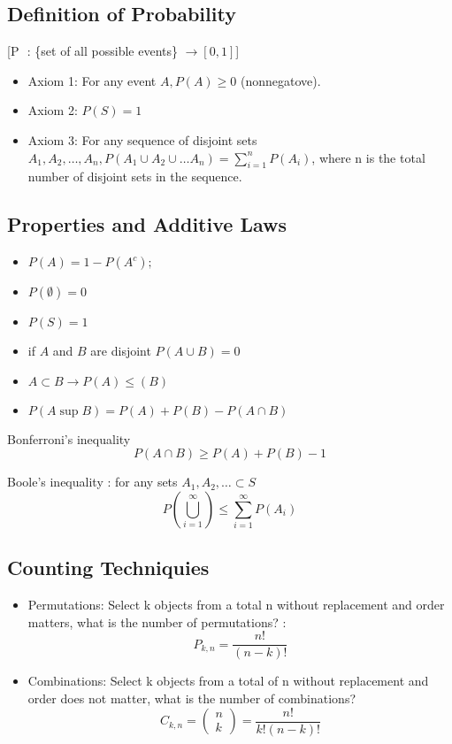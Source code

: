 \documentclass[12pt]{article}
\begin{document}
\subsection*{Definition of Probability \cite[p.4]{classnotes.2}}
[P \(\) : \{set of all possible events\} $\rightarrow [0,1]$]
\begin{itemize}

\item Axiom 1: For any event $A, P(A)\geq 0$ (nonnegatove).
\item Axiom 2: $P(S)=1$
\item Axiom 3: For any sequence of disjoint sets $A_1,A_2,\dots,A_n, P(A_1 \cup A_2 \cup \dots A_n)=\sum\limits_{i=1}^nP(A_i)$, where n is the total number of disjoint sets in the sequence.

\end {itemize}

\subsection*{Properties and Additive Laws \cite[p.5]{classnotes.2}}
\begin{itemize}
\item $P(A)=1-P(A^c);$
\item $P(\emptyset)=0$
\item $P(S)=1$
\item if $A$ and $B$ are disjoint $P(A\cup B)=0$
\item $A\subset B \rightarrow P(A)\leq (B)$
\item $P(A \sup B) = P(A) + P(B) - P(A \cap B)$
\end{itemize}

Bonferroni's inequality \cite[p.6]{classnotes.2}
$$P(A\cap B) \geq P(A) + P(B) - 1$$

Boole's inequality \cite[p.5]{classnotes.2}: for any sets $A_1, A_2, \dots \subset S$
$$P(\bigcup\limits_{i=1}^\infty)\leq \sum\limits_{i=1}^\infty P(A_i)$$

\subsection*{Counting Techniquies}

\begin{itemize}
\item Permutations: Select k objects from a total n without replacement and order matters, what is the number of permutations? \cite[p.9]{classnotes.2}:
$$P_{k,n} = \frac{n!}{(n-k)!}$$
\item Combinations: Select k objects from a total of n without replacement and order does not matter, what is the number of combinations? \cite[p.10]{classnotes.2}
$$C_{k,n}=
\begin{pmatrix}
n \\
k
\end{pmatrix}
=\frac{n!}{k!(n-k)!}
$$
\end{itemize}
\end{document}
